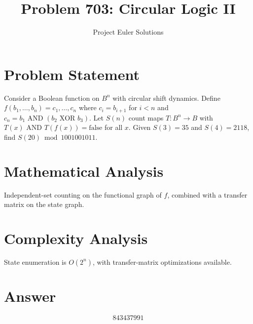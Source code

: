 \documentclass[11pt]{article}
\title{Problem 703: Circular Logic II}
\author{Project Euler Solutions}
\date{}
\begin{document}
\maketitle

\section{Problem Statement}

Consider a Boolean function on $B^n$ with circular shift dynamics. Define $f(b_1,\dots,b_n)=c_1,\dots,c_n$ where $c_i=b_{i+1}$ for $i<n$ and $c_n = b_1 \text{ AND } (b_2 \text{ XOR } b_3)$. Let $S(n)$ count maps $T:B^n\to B$ with $T(x) \text{ AND } T(f(x)) = \text{false}$ for all $x$. Given $S(3)=35$ and $S(4)=2118$, find $S(20)\bmod 1001001011$.

\section{Mathematical Analysis}

Independent-set counting on the functional graph of $f$, combined with a transfer matrix on the state graph.

\section{Complexity Analysis}

State enumeration is $O(2^n)$, with transfer-matrix optimizations available.

\section{Answer}

\[
\boxed{843437991}
\]
\end{document}
